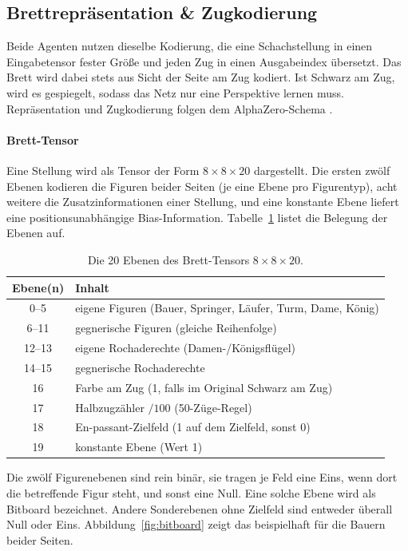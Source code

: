 \documentclass[
  a4paper, 12pt,
  parskip=half,
  headings=small,
  bibliography=totoc
]{scrartcl}
\begin{document}
\subsection{Brettrepräsentation \& Zugkodierung}\label{sec:encoding} %
Beide Agenten nutzen dieselbe Kodierung, die eine Schachstellung in einen
Eingabetensor fester Größe und jeden Zug in einen Ausgabeindex übersetzt. Das
Brett wird dabei stets aus Sicht der Seite am Zug kodiert. Ist Schwarz am Zug,
wird es gespiegelt, sodass das Netz nur eine Perspektive lernen muss. Repräsentation
und Zugkodierung folgen dem AlphaZero-Schema \parencite{silver2018}.

\paragraph{Brett-Tensor}
Eine Stellung wird als Tensor der Form \(8\times8\times20\) dargestellt. Die ersten
zwölf Ebenen kodieren die Figuren beider Seiten (je eine Ebene pro Figurentyp),
acht weitere die Zusatzinformationen einer Stellung, und eine konstante Ebene
liefert eine positionsunabhängige Bias-Information. Tabelle~\ref{tab:planes}
listet die Belegung der Ebenen auf.

\begin{table}[htbp]
  \centering
  \begin{tabular}{cl}
    \hline
    Ebene(n) & Inhalt \\
    \hline
    0--5   & eigene Figuren (Bauer, Springer, Läufer, Turm, Dame, König) \\
    6--11  & gegnerische Figuren (gleiche Reihenfolge) \\
    12--13 & eigene Rochaderechte (Damen-/Königsflügel) \\
    14--15 & gegnerische Rochaderechte \\
    16     & Farbe am Zug (1, falls im Original Schwarz am Zug) \\
    17     & Halbzugzähler \(/100\) (50-Züge-Regel) \\
    18     & En-passant-Zielfeld (1 auf dem Zielfeld, sonst 0) \\
    19     & konstante Ebene (Wert 1) \\
    \hline
  \end{tabular}
  \caption{Die 20 Ebenen des Brett-Tensors \(8\times8\times20\).}
  \label{tab:planes}
\end{table}

Die zwölf Figurenebenen sind rein binär, sie tragen je Feld eine Eins, wenn dort
die betreffende Figur steht, und sonst eine Null. Eine solche Ebene wird als
Bitboard bezeichnet. Andere Sonderebenen ohne Zielfeld sind entweder überall Null oder Eins.
Abbildung~\ref{fig:bitboard} zeigt das beispielhaft für die Bauern beider Seiten.
\end{document}

